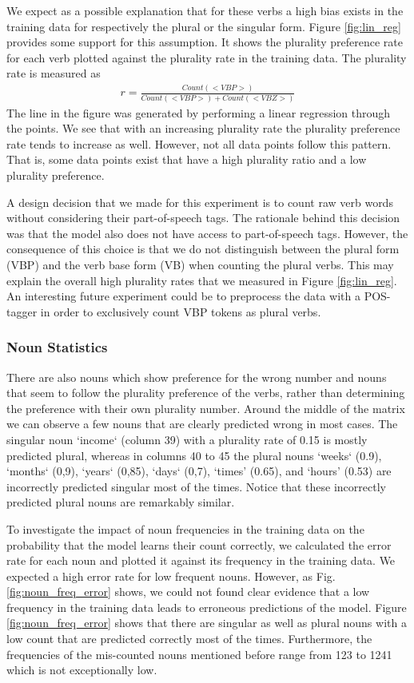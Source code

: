 We expect as a possible explanation that for these verbs a high bias exists
in the training data for respectively the plural or the singular form.
Figure \ref{fig:lin_reg} provides some support for this assumption. It shows the plurality preference rate for each verb plotted against the plurality rate in the training data. 
The plurality rate is measured as
\begin{align*}
	r = \frac{Count(<VBP>)}{Count(<VBP>) + Count(<VBZ>)} 
\end{align*}
The line in the figure was generated by performing a linear regression through the points.
We see that with an increasing plurality rate the plurality preference rate tends to increase as well. 
However, not all data points follow this pattern.
That is, some data points exist that have a high plurality ratio and a
low plurality preference. 

A design decision that we made for this experiment is to
count raw verb words without considering their part-of-speech tags.
The rationale behind this decision was that the model also
does not have access to part-of-speech tags.
However, the consequence of this choice is that
we do not distinguish between the plural form (VBP) 
and the verb base form (VB) when counting the plural verbs. 
This may explain the overall high plurality rates that 
we measured in Figure \ref{fig:lin_reg}.
An interesting future experiment could be  
to preprocess the data with a POS-tagger 
in order to exclusively count VBP tokens as plural verbs.

\subsubsection{Noun Statistics}

There are also nouns which show preference for the wrong number and nouns
that seem to follow the plurality preference of the verbs, 
rather than determining the preference with their own plurality number.
Around the middle of the matrix we can observe a few nouns that are clearly predicted wrong in most cases. The singular noun `income` (column 39) with a plurality rate of 0.15 is mostly predicted plural, whereas in columns 40 to 45 the plural nouns `weeks` (0.9), `months` (0,9), `years` (0,85), `days` (0,7), `times' (0.65), and `hours' (0.53) are incorrectly predicted singular most of the times. Notice that these incorrectly predicted
plural nouns are remarkably similar.

To investigate the impact of noun frequencies in the training data on the 
probability that the model learns their count correctly, 
we calculated the error rate for each noun and plotted it against its frequency
in the training data. 
We expected a high error rate for low frequent nouns. 
However, as Fig. \ref{fig:noun_freq_error} shows, we could not found clear evidence 
that a low frequency in the training data leads to erroneous predictions of the model. 
Figure \ref{fig:noun_freq_error} shows that there are singular as well as plural nouns 
with a low count that are predicted correctly most of the times.
Furthermore, the frequencies of the mis-counted nouns mentioned before
range from 123 to 1241 which is not exceptionally low.
 
